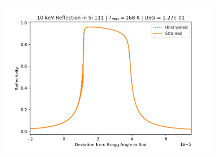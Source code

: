 \documentclass[preprint]{iucr}              %
\begin{document}
\begin{figure}
\includegraphics{images/111_10keV_8.png}
\label{fig:111usg10kev}
\end{figure}
\end{document}
